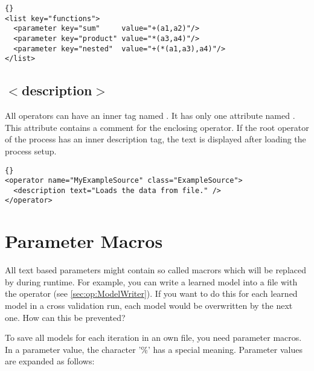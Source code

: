 {\begin{lstlisting}[style=rapidminerxmlstyle]{}
<list key="functions">
  <parameter key="sum"     value="+(a1,a2)"/>
  <parameter key="product" value="*(a3,a4)"/>
  <parameter key="nested"  value="+(*(a1,a3),a4)"/>
</list>
\end{lstlisting}



\subsection*{$<$description$>$}
All operators can have an inner tag named . It has
only one attribute named . This attribute contains a comment
for the enclosing operator. If the root operator of the process has
an inner description tag, the text is displayed after loading the
process setup.

\begin{lstlisting}[style=rapidminerxmlstyle]{}
<operator name="MyExampleSource" class="ExampleSource">
  <description text="Loads the data from file." />
</operator>
\end{lstlisting}


\section{Parameter Macros}
\label{parameter_macros}

All text based parameters might contain so called macrors which will be replaced
by \rapidminer during runtime. For example, you can write a learned model into a file 
with the operator  (see \ref{sec:op:ModelWriter}). If you want to do
this for each learned model in a cross validation run, each model would be overwritten
by the next one. How can this be prevented?

To save all models for each iteration in an own file, you need parameter macros.
In a parameter value, the character '\%' has a special meaning. Parameter values 
are expanded as follows:

}
